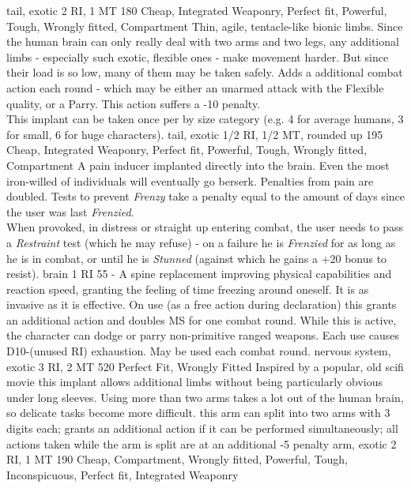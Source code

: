 \documentclass[12pt,a4paper,openany,usenames,dvipsnames]{book}
\begin{document}
\begin{multicols}{2}
        {tail, exotic}
        {2 RI, 1 MT}
        {180}
        {Cheap, Integrated Weaponry, Perfect fit, Powerful, Tough, Wrongly fitted, Compartment}
	    {Thin, agile, tentacle-like bionic limbs.
	    	Since the human brain can only really deal with two arms and two legs, any additional limbs
	    		- especially such exotic, flexible ones - make movement harder.
    		But since their load is so low, many of them may be taken safely.}
    	{Adds a additional combat action each round
    		- which may be either an unarmed attack with the Flexible quality,
    		or a Parry.
    		This action suffers a -10 penalty.
    		\\%
    	This implant can be taken once per by size category (e.g. 4 for average humans, 3 for small, 6 for huge characters).}
    	{tail, exotic}
    	{1/2 RI, 1/2 MT, rounded up}
    	{195}
    	{Cheap, Integrated Weaponry, Perfect fit, Powerful, Tough, Wrongly fitted, Compartment}
    	{A pain inducer implanted directly into the brain.
    		Even the most iron-willed of individuals will eventually go berserk.}
    	{Penalties from pain are doubled.
    		Tests to prevent \emph{Frenzy} take a penalty equal to
    		the amount of days since the user was last \emph{Frenzied}.
    		\\
    		When provoked, in distress or straight up entering combat, the user needs to pass a \emph{Restraint} test
    		(which he may refuse)
    		- on a failure he is \emph{Frenzied} for as long as he is in combat,
    		or until he is \emph{Stunned} (against which he gains a +20 bonus to resist).
    		}
    	{brain}
    	{1 RI}
    	{55}
    	{-}
    	{A spine replacement improving physical capabilities and reaction speed,
    		granting the feeling of time freezing around oneself.
    		It is as invasive as it is effective.}
    	{On use (as a free action during declaration) this grants an additional action and doubles MS for one combat round.
    		While this is active, the character can dodge or parry non-primitive ranged weapons.
    		Each use causes D10-(unused RI) exhaustion.
    		May be used each combat round.}
    	{nervous system, exotic}
    	{3 RI, 2 MT}
    	{520}
    	{Perfect Fit, Wrongly Fitted}
        {Inspired by a popular, old scifi movie this implant allows additional limbs without being particularly obvious under long sleeves. Using more than two arms takes a lot out of the human brain, so delicate tasks become more difficult.}
        {this arm can split into two arms with 3 digits each; grants an additional action if it can be performed simultaneously; all actions taken while the arm is split are at an additional -5 penalty}
        {arm, exotic}
        {2 RI, 1 MT}
        {190}
        {Cheap, Compartment, Wrongly fitted, Powerful, Tough, Inconspicuous, Perfect fit, Integrated Weaponry}
    \end{multicols}
\end{document}
